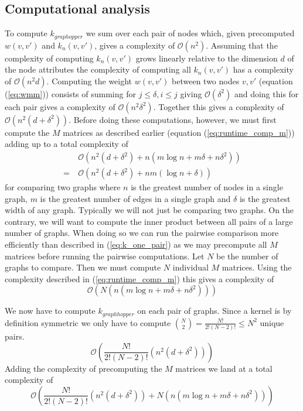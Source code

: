 \documentclass{article}
\begin{document}
\subsection{Computational analysis}
\label{sec:computational_analysis}
To compute $k_{graphopper}$ we sum over each pair of nodes which, given precomputed $w(v,v')$ and $k_n(v,v')$, gives a complexity of $\mathcal{O}(n^2)$. Assuming that the complexity of computing $k_n(v,v')$ grows linearly relative to the dimension $d$ of the node attributes the complexity of computing all $k_n(v,v')$ has a complexity of $\mathcal{O}(n^2d)$. Computing the weight $w(v,v')$ between two nodes $v,v'$ (equation (\ref{eq:wmm})) consists of summing for $j\leq \delta,i\leq j$ giving $\mathcal{O}(\delta^2)$ and doing this for each pair gives a complexity of $\mathcal{O}(n^2\delta^2)$. Together this gives a complexity of $\mathcal{O}(n^2(d + \delta^2))$. Before doing these computations, however, we must first compute the $M$ matrices as described earlier (equation (\ref{eq:runtime_comp_m})) adding up to a total complexity of
\begin{align}
&\mathcal{O}\left(n^2\left(d + \delta^2\right) + n\left(m\log n + m\delta + n\delta^2\right)\right)\\
=\ &\mathcal{O}\left(n^2\left(d+\delta^2\right)+nm\left(\log n + \delta\right)\right)
\label{eq:k_one_pair}
\end{align}
for comparing two graphs where $n$ is the greatest number of nodes in a single graph, $m$ is the greatest number of edges in a single graph and $\delta$ is the greatest width of any graph. Typically we will not just be comparing two graphs. On the contrary, we will want to compute the inner product between all pairs of a large number of graphs. When doing so we can run the pairwise comparison more efficiently than described in (\ref{eq:k_one_pair}) as we may precompute all $M$ matrices before running the pairwise computations. Let $N$ be the number of graphs to compare. Then we must compute $N$ individual $M$ matrices. Using the complexity described in (\ref{eq:runtime_comp_m}) this gives a complexity of
\begin{equation}
\mathcal{O}\left(N\left(n\left(m\log n + m\delta + n\delta^2\right)\right)\right)
\end{equation}

We now have to compute $k_{graphhopper}$ on each pair of graphs. Since a kernel is by definition symmetric we only have to compute  $\binom{N}{2}=\frac{N!}{2!(N-2)!}\leq N^2$ unique pairs.
\begin{equation}
\mathcal{O}\left(\frac{N!}{2!(N-2)!}\left(n^2\left(d+\delta^2\right)\right)\right)
\end{equation}
Adding the complexity of precomputing the $M$ matrices we land at a total complexity of
\begin{equation}
\mathcal{O}\left(\frac{N!}{2!(N-2)!}\left(n^2\left(d+\delta^2\right)\right) + N\left(n\left(m\log n + m\delta + n\delta^2\right)\right)\right)
\end{equation}
\end{document}
